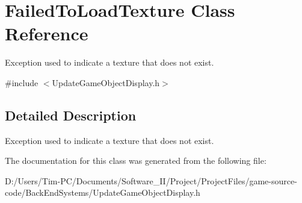 \hypertarget{class_failed_to_load_texture}{}\section{Failed\+To\+Load\+Texture Class Reference}
\label{class_failed_to_load_texture}


Exception used to indicate a texture that does not exist.  




{\ttfamily \#include $<$Update\+Game\+Object\+Display.\+h$>$}



\subsection{Detailed Description}
Exception used to indicate a texture that does not exist. 

The documentation for this class was generated from the following file\+:\begin{DoxyCompactItemize}
\item 
D\+:/\+Users/\+Tim-\/\+P\+C/\+Documents/\+Software\+\_\+\+I\+I/\+Project/\+Project\+Files/game-\/source-\/code/\+Back\+End\+Systems/Update\+Game\+Object\+Display.\+h\end{DoxyCompactItemize}
